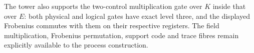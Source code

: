 The tower also supports the two-control multiplication gate over $K$
inside that over $E$: both physical and logical gates have exact level
three, and the displayed Frobenius commutes with them on their respective
registers.  The field multiplication, Frobenius permutation, support code
and trace fibres remain explicitly available to the process construction.
